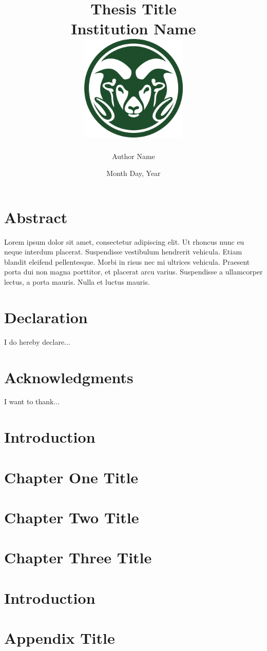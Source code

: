 \documentclass[11pt,twoside]{report}
\title{
	{Thesis Title}\\
	{\large Institution Name}\\
	{\includegraphics[width=2in]{universitylogo.png}}
}
\author{Author Name}
\date{Month Day, Year}
\begin{document}
\maketitle
\chapter*{Abstract}
Lorem ipsum dolor sit amet, consectetur adipiscing elit. Ut rhoncus nunc eu neque interdum placerat. Suspendisse vestibulum hendrerit vehicula. Etiam blandit eleifend pellentesque. Morbi in risus nec mi ultrices vehicula. Praesent porta dui non magna porttitor, et placerat arcu varius. Suspendisse a ullamcorper lectus, a porta mauris. Nulla et luctus mauris. 

\chapter*{Declaration}
I do hereby declare...

\chapter*{Acknowledgments}
I want to thank...

\tableofcontents

\chapter{Introduction}


\chapter{Chapter One Title}


\chapter{Chapter Two Title}


\chapter{Chapter Three Title}


\chapter{Introduction}


\appendix
\chapter{Appendix Title}

\end{document}
